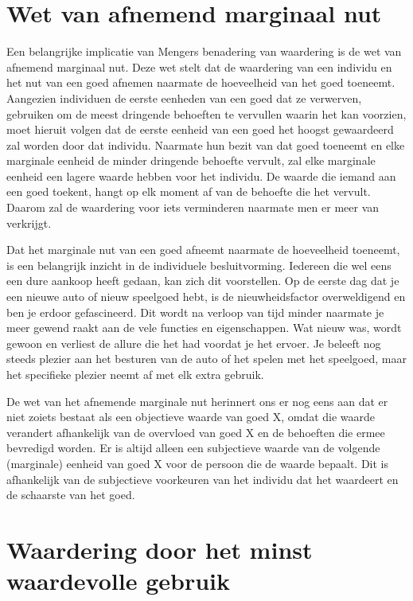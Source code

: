 \documentclass[
  a5paper,
  smalldemyvopaper,11pt,twoside,onecolumn,openright,extrafontsizes,
hidelinks]{memoir}
\begin{document}
\section{Wet van afnemend marginaal
nut}\label{wet-van-afnemend-marginaal-nut}

Een belangrijke implicatie van Mengers benadering van waardering is de
wet van afnemend marginaal nut. Deze wet stelt dat de waardering van een
individu en het nut van een goed afnemen naarmate de hoeveelheid van het
goed toeneemt. Aangezien individuen de eerste eenheden van een goed dat
ze verwerven, gebruiken om de meest dringende behoeften te vervullen
waarin het kan voorzien, moet hieruit volgen dat de eerste eenheid van
een goed het hoogst gewaardeerd zal worden door dat individu. Naarmate
hun bezit van dat goed toeneemt en elke marginale eenheid de minder
dringende behoefte vervult, zal elke marginale eenheid een lagere waarde
hebben voor het individu. De waarde die iemand aan een goed toekent,
hangt op elk moment af van de behoefte die het vervult. Daarom zal de
waardering voor iets verminderen naarmate men er meer van verkrijgt.

Dat het marginale nut van een goed afneemt naarmate de hoeveelheid
toeneemt, is een belangrijk inzicht in de individuele besluitvorming.
Iedereen die wel eens een dure aankoop heeft gedaan, kan zich dit
voorstellen. Op de eerste dag dat je een nieuwe auto of nieuw speelgoed
hebt, is de nieuwheidsfactor overweldigend en ben je erdoor
gefascineerd. Dit wordt na verloop van tijd minder naarmate je meer
gewend raakt aan de vele functies en eigenschappen. Wat nieuw was, wordt
gewoon en verliest de allure die het had voordat je het ervoer. Je
beleeft nog steeds plezier aan het besturen van de auto of het spelen
met het speelgoed, maar het specifieke plezier neemt af met elk extra
gebruik.

De wet van het afnemende marginale nut herinnert ons er nog eens aan dat
er niet zoiets bestaat als een objectieve waarde van goed X, omdat die
waarde verandert afhankelijk van de overvloed van goed X en de behoeften
die ermee bevredigd worden. Er is altijd alleen een subjectieve waarde
van de volgende (marginale) eenheid van goed X voor de persoon die de
waarde bepaalt. Dit is afhankelijk van de subjectieve voorkeuren van het
individu dat het waardeert en de schaarste van het goed.

\section{Waardering door het minst waardevolle
gebruik}\label{waardering-door-het-minst-waardevolle-gebruik}
\end{document}
